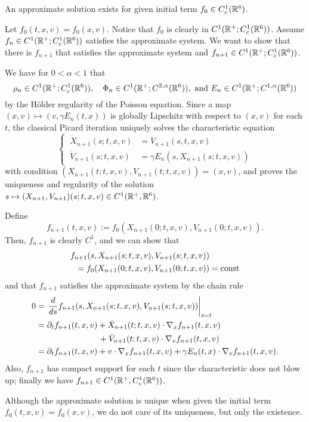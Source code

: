 \documentclass[11pt]{amsart}
\begin{document}
\begin{prop}
An approximate solution exists for given initial term $f_0\in C_c^1(\mathbb{R}^6)$.
\end{prop}
\begin{pf}
Let $f_0(t,x,v)=f_0(x,v)$.
Notice that $f_0$ is clearly in $C^1(\mathbb{R}^+;C_c^1(\mathbb{R}^6))$.
Assume $f_n\in C^1(\mathbb{R}^+;C_c^1(\mathbb{R}^6))$ satisfies the approximate system.
We want to show that there is $f_{n+1}$ that satisfies the approximate system and $f_{n+1}\in C^1(\mathbb{R}^+;C_c^1(\mathbb{R}^6))$.

We have for $0<\alpha<1$ that
\[\rho_n\in C^1(\R^+;C_c^1(\R^6)),\quad\Phi_n\in C^1(\R^+;C^{2,\alpha}(\R^6)),\ \text{and}\ E_n\in C^1(\R^+;C^{1,\alpha}(\R^6))\]
by the H\"older regularity of the Poisson equation.
Since a map $(x,v)\mapsto(v,\gamma E_n(t,x))$ is globally Lipschitz with respect to $(x,v)$ for each $t$, the classical Picard iteration uniquely solves the characteristic equation
\[\left\{\ \begin{alignedat}{2}
\dot X_{n+1}(s;t,x,v)&=V_{n+1}(s,t,x,v)\\
\dot V_{n+1}(s;t,x,v)&=\gamma E_n(s,X_{n+1}(s;t,x,v))
\end{alignedat}\right.\]
with condition $(X_{n+1}(t;t,x,v),V_{n+1}(t;t,x,v))=(x,v)$, and proves the uniqueness and regularity of the solution $s\mapsto(X_{n+1},V_{n+1})(s;t,x,v)\in C^1(\mathbb{R}^+,\mathbb{R}^6)$.

Define
\[f_{n+1}(t,x,v):=f_0(X_{n+1}(0;t,x,v),V_{n+1}(0;t,x,v)).\]
Then, $f_{n+1}$ is clearly $C^1$, and we can show that
\begin{align*}
f_{n+1}(s,X_{n+1}(s;t,x,v),V_{n+1}(s;t,x,v))&\\
=f_0(X_{n+1}(0;t,x,v),V_{n+1}(0;t,x,v))&=\operatorname{const}
\end{align*}
and that $f_{n+1}$ satisfies the approximate system by the chain rule
\begin{align*}
0&=\left.\dd{s}f_{n+1}(s,X_{n+1}(s;t,x,v),V_{n+1}(s;t,x,v))\right|_{s=t}\\
&=\pd_tf_{n+1}(t,x,v)+\dot X_{n+1}(t;t,x,v)\cdot\del_xf_{n+1}(t,x,v)\\
&\hspace{7.5em}+\dot V_{n+1}(t;t,x,v)\cdot\del_vf_{n+1}(t,x,v)\\
&=\pd_tf_{n+1}(t,x,v)+v\cdot\del_xf_{n+1}(t,x,v)+\gamma E_n(t,x)\cdot\del_vf_{n+1}(t,x,v).
\end{align*}
Also, $f_{n+1}$ has compact support for each $t$ since the characteristic does not blow up; finally we have $f_{n+1}\in C^1(\mathbb{R}^+,C_c^1(\mathbb{R}^6))$.
\end{pf}
\begin{rmk}
Although the approximate solution is unique when given the initial term $f_0(t,x,v)=f_0(x,v)$, we do not care of its uniqueness, but only the existence.
\end{rmk}
\end{document}
